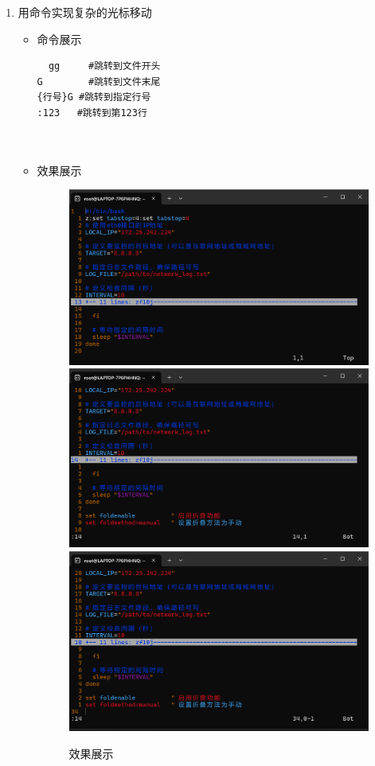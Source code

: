 \documentclass[UTF8]{ctexart}
\begin{document}
\begin{enumerate}
  \item 用命令实现复杂的光标移动
  \begin{itemize}
  \item 命令展示
  \begin{verbatim}
  gg     #跳转到文件开头
G        #跳转到文件末尾
{行号}G #跳转到指定行号
:123   #跳转到第123行

    
  \end{verbatim}

  \item 效果展示
  \begin{figure}[H]
    \centering
    \includegraphics[width=\textwidth]{291}
    \includegraphics[width=\textwidth]{292}
    \includegraphics[width=\textwidth]{293} %
    \caption{效果展示}
  
  \end{figure}
\end{itemize}
\end{enumerate}
\end{document}
